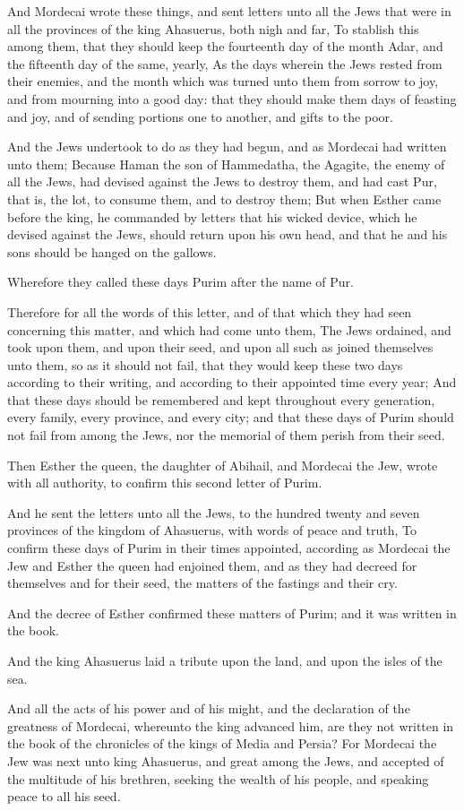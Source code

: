 \Verse And Mordecai wrote these things, and sent letters unto all the Jews that were in all the provinces of the king Ahasuerus, both nigh and far, \Verse To stablish this among them, that they should keep the fourteenth day of the month Adar, and the fifteenth day of the same, yearly, \Verse As the days wherein the Jews rested from their enemies, and the month which was turned unto them from sorrow to joy, and from mourning into a good day: that they should make them days of feasting and joy, and of sending portions one to another, and gifts to the poor.

\Verse And the Jews undertook to do as they had begun, and as Mordecai had written unto them; \Verse Because Haman the son of Hammedatha, the Agagite, the enemy of all the Jews, had devised against the Jews to destroy them, and had cast Pur, that is, the lot, to consume them, and to destroy them; \Verse But when Esther came before the king, he commanded by letters that his wicked device, which he devised against the Jews, should return upon his own head, and that he and his sons should be hanged on the gallows.

\Verse Wherefore they called these days Purim after the name of Pur.

Therefore for all the words of this letter, and of that which they had seen concerning this matter, and which had come unto them, \Verse The Jews ordained, and took upon them, and upon their seed, and upon all such as joined themselves unto them, so as it should not fail, that they would keep these two days according to their writing, and according to their appointed time every year; \Verse And that these days should be remembered and kept throughout every generation, every family, every province, and every city; and that these days of Purim should not fail from among the Jews, nor the memorial of them perish from their seed.

\Verse Then Esther the queen, the daughter of Abihail, and Mordecai the Jew, wrote with all authority, to confirm this second letter of Purim.

\Verse And he sent the letters unto all the Jews, to the hundred twenty and seven provinces of the kingdom of Ahasuerus, with words of peace and truth, \Verse To confirm these days of Purim in their times appointed, according as Mordecai the Jew and Esther the queen had enjoined them, and as they had decreed for themselves and for their seed, the matters of the fastings and their cry.

\Verse And the decree of Esther confirmed these matters of Purim; and it was written in the book.


\Chapter
\Verse And the king Ahasuerus laid a tribute upon the land, and upon the isles of the sea.

\Verse And all the acts of his power and of his might, and the declaration of the greatness of Mordecai, whereunto the king advanced him, are they not written in the book of the chronicles of the kings of Media and Persia?  \Verse For Mordecai the Jew was next unto king Ahasuerus, and great among the Jews, and accepted of the multitude of his brethren, seeking the wealth of his people, and speaking peace to all his seed.


